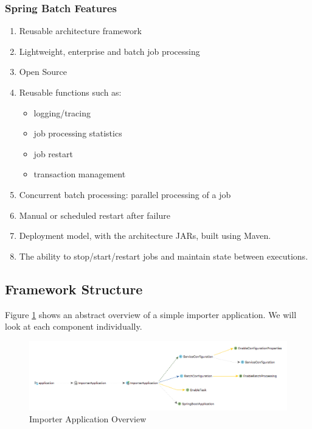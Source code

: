 \subsubsection{Spring Batch Features}\label{spring-batch-features}

\begin{enumerate}
\def\labelenumi{\arabic{enumi}.}
\tightlist
\item
  Reusable architecture framework
\item
  Lightweight, enterprise and batch job processing
\item
  Open Source
\item
  Reusable functions such as:

  \begin{itemize}
  \tightlist
  \item
    logging/tracing
  \item
    job processing statistics
  \item
    job restart
  \item
    transaction management
  \end{itemize}
\item
  Concurrent batch processing: parallel processing of a job
\item
  Manual or scheduled restart after failure
\item
  Deployment model, with the architecture JARs, built using Maven.
\item
  The ability to stop/start/restart jobs and maintain state between
  executions.
\end{enumerate}

\subsection{Framework Structure}\label{framework-structure}

Figure \ref{fig:importer-app} shows an abstract overview of a simple importer
application. We will look at each component individually.

\begin{figure}
\centering
	\includegraphics[width=1.00\textwidth]{images/components_diagram.png}
	\caption{Importer Application Overview}
	\label{fig:importer-app}
\end{figure}

